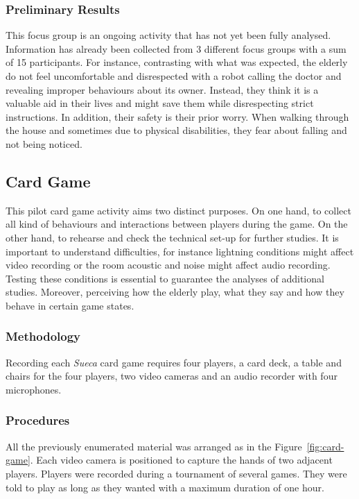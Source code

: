 \subsubsection{Preliminary Results}

This focus group is an ongoing activity that has not yet been fully analysed.
Information has already been collected from 3 different focus groups with a sum of 15 participants.
For instance, contrasting with what was expected, the elderly do not feel uncomfortable and disrespected with a robot calling the doctor and revealing improper behaviours about its owner.
Instead, they think it is a valuable aid in their lives and might save them while disrespecting strict instructions.
In addition, their safety is their prior worry.
When walking through the house and sometimes due to physical disabilities, they fear about falling and not being noticed.







\subsection{Card Game}
This pilot card game activity aims two distinct purposes.
On one hand, to collect all kind of behaviours and interactions between players during the game.
On the other hand, to rehearse and check the technical set-up for further studies.
It is important to understand difficulties, for instance lightning conditions might affect video recording or the room acoustic and noise might affect audio recording.
Testing these conditions is essential to guarantee the analyses of additional studies.
Moreover, perceiving how the elderly play, what they say and how they behave in certain game states.

\subsubsection{Methodology}
Recording each \emph{Sueca} card game requires four players, a card deck, a table and chairs for the four players, two video cameras and an audio recorder with four microphones.

\subsubsection{Procedures}
All the previously enumerated material was arranged as in the Figure~\ref{fig:card-game}.
Each video camera is positioned to capture the hands of two adjacent players.
Players were recorded during a tournament of several games.
They were told to play as long as they wanted with a maximum duration of one hour.

